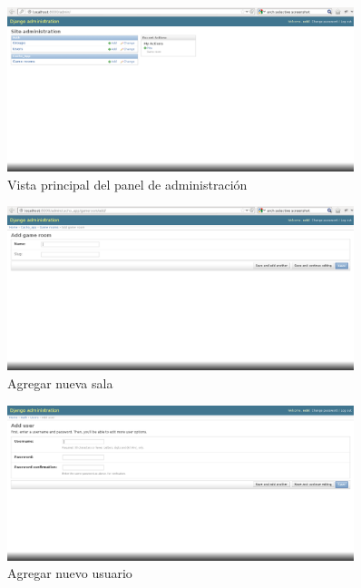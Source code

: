 \documentclass[a4paper,11pt]{article}
\begin{document}
\begin{figure}[h!]
	\centering
	\includegraphics[width=0.9\textwidth]{AdminCp.png}
	\caption{Vista principal del panel de administración}
\end{figure}

\begin{figure}[h!]
	\centering
	\includegraphics[width=0.9\textwidth]{Admin_addroom.png}
	\caption{Agregar nueva sala}
\end{figure}

\begin{figure}[h!]
	\centering
	\includegraphics[width=0.9\textwidth]{Admin_adduser.png}
	\caption{Agregar nuevo usuario}
\end{figure}
\end{document}
